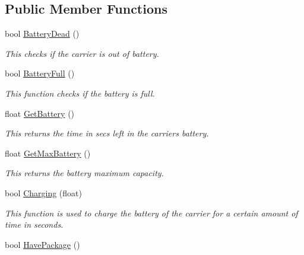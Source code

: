 \subsection*{Public Member Functions}
\begin{DoxyCompactItemize}
\item 
bool \hyperlink{classcsci3081_1_1Carrier_abbf8f72d3b13da90793555e25053d793}{Battery\+Dead} ()
\begin{DoxyCompactList}\small\item\em This checks if the carrier is out of battery. \end{DoxyCompactList}\item 
bool \hyperlink{classcsci3081_1_1Carrier_aaeb0a45df6b9fa522e04681da272cb6f}{Battery\+Full} ()
\begin{DoxyCompactList}\small\item\em This function checks if the battery is full. \end{DoxyCompactList}\item 
\mbox{\label{classcsci3081_1_1Carrier_ad8e833d85c22f1f516646360aa852338}} 
float \hyperlink{classcsci3081_1_1Carrier_ad8e833d85c22f1f516646360aa852338}{Get\+Battery} ()
\begin{DoxyCompactList}\small\item\em This returns the time in secs left in the carrier\textquotesingle{}s battery. \end{DoxyCompactList}\item 
\mbox{\label{classcsci3081_1_1Carrier_a5935ddc44bb01290fe65168332d5a811}} 
float \hyperlink{classcsci3081_1_1Carrier_a5935ddc44bb01290fe65168332d5a811}{Get\+Max\+Battery} ()
\begin{DoxyCompactList}\small\item\em This returns the battery maximum capacity. \end{DoxyCompactList}\item 
bool \hyperlink{classcsci3081_1_1Carrier_aa004703e60b8ffed9661ee204f619983}{Charging} (float)
\begin{DoxyCompactList}\small\item\em This function is used to charge the battery of the carrier for a certain amount of time in seconds. \end{DoxyCompactList}\item 
bool \hyperlink{classcsci3081_1_1Carrier_a5f20ff445085ba10866ff83dc3d2ea93}{Have\+Package} ()

\end{DoxyCompactItemize}

